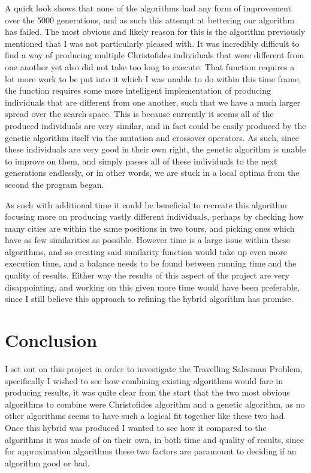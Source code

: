 \documentclass[11pt,a4paper,titlepage]{article}
\begin{document}
A quick look shows that none of the algorithms had any form of improvement over the 5000 generations, and as such this attempt at bettering our algorithm has failed. The most obvious and likely reason for this is the algorithm previously mentioned that I was not particularly pleased with. It was incredibly difficult to find a way of producing multiple Christofides individuals that were different from one another yet also did not take too long to execute. That function requires a lot more work to be put into it which I was unable to do within this time frame, the function requires some more intelligent implementation of producing individuals that are different from one another, such that we have a much larger spread over the search space. This is because currently it seems all of the produced individuals are very similar, and in fact could be easily produced by the genetic algorithm itself via the mutation and crossover operators. As such, since these individuals are very good in their own right, the genetic algorithm is unable to improve on them, and simply passes all of these individuals to the next generations endlessly, or in other words, we are stuck in a local optima from the second the program began.

As such with additional time it could be beneficial to recreate this algorithm focusing more on producing vastly different individuals, perhaps by checking how many cities are within the same positions in two tours, and picking ones which have as few similarities as possible. However time is a large issue within these algorithms, and so creating said similarity function would take up even more execution time, and a balance needs to be found between running time and the quality of results. Either way the results of this aspect of the project are very disappointing, and working on this given more time would have been preferable, since I still believe this approach to refining the hybrid algorithm has promise.

\section{Conclusion}

I set out on this project in order to investigate the Travelling Salesman Problem, specifically I wished to see how combining existing algorithms would fare in producing results, it was quite clear from the start that the two most obvious algorithms to combine were Christofides algorithm and a genetic algorithm, as no other algorithms seems to have such a logical fit together like these two had. Once this hybrid was produced I wanted to see how it compared to the algorithms it was made of on their own, in both time and quality of results, since for approximation algorithms these two factors are paramount to deciding if an algorithm good or bad.
\end{document}
